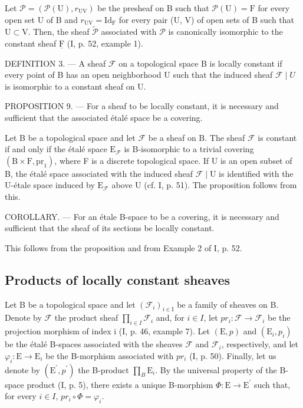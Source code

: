 Let \(\mathcal{P} = (\mathcal{P}(\mathrm{U}), r_{\mathrm{UV}})\) be the presheaf on B such that \(\mathcal{P}(\mathrm{U}) = \mathrm{F}\) for every open set U of B and \(r_{\mathrm{UV}} = \mathrm{Id}_{\mathrm{F}}\) for every pair (U, V) of open sets of B such that \(\mathrm{U} \subset \mathrm{V}\). Then, the sheaf \(\widetilde{\mathcal{P}}\) associated with \(\mathcal{P}\) is canonically isomorphic to the constant sheaf \(\underline{\mathrm{F}}\) (I, p. 52, example 1).

DEFINITION 3. --- A sheaf \(\mathcal{F}\) on a topological space B is locally constant if every point of B has an open neighborhood U such that the induced sheaf \(\mathcal{F} \mid U\) is isomorphic to a constant sheaf on U.

PROPOSITION 9. --- For a sheaf to be locally constant, it is necessary and sufficient that the associated étalé space be a covering.

Let B be a topological space and let \(\mathcal{F}\) be a sheaf on B. The sheaf \(\mathcal{F}\) is constant if and only if the étalé space \(\mathrm{E}_{\mathcal{F}}\) is B-isomorphic to a trivial covering \((\mathrm{B} \times \mathrm{F},\mathrm{pr}_1)\), where F is a discrete topological space. If U is an open subset of B, the étalé space associated with the induced sheaf \(\mathcal{F} \mid \mathrm{U}\) is identified with the U-étale space induced by \(\mathrm{E}_{\mathcal{F}}\) above U (cf. I, p. 51). The proposition follows from this.

COROLLARY. --- For an étale B-space to be a covering, it is necessary and sufficient that the sheaf of its sections be locally constant.

This follows from the proposition and from Example 2 of I, p. 52.

\subsection{Products of locally constant sheaves}

Let B be a topological space and let \((\mathcal{F}_{i})_{i\in\mathrm{I}}\) be a family of sheaves on B. Denote by \(\mathcal{F}\) the product sheaf \(\prod_{i\in I}\mathcal{F}_{i}\) and, for \(i\in I\), let \(pr_{i}\colon \mathcal{F}\to\mathcal{F}_{i}\) be the projection morphism of index i (I, p. 46, example 7). Let \((\mathrm{E},p)\) and \((\mathrm{E}_{i},p_{i})\) be the étalé B-spaces associated with the sheaves \(\mathcal{F}\) and \(\mathcal{F}_{i}\), respectively, and let \(\varphi_{i}\colon \mathrm{E}\to \mathrm{E}_{i}\) be the B-morphism associated with \(pr_{i}\) (I, p. 50). Finally, let us denote by \((\mathrm{E}^{\prime},p^{\prime})\) the B-product \(\prod_{B}\mathrm{E}_{i}\). By the universal property of the B-space product (I, p. 5), there exists a unique B-morphism \(\Phi\colon \mathrm{E}\to \mathrm{E}^{\prime}\) such that, for every \(i\in I\), \(pr_{i}\circ\Phi=\varphi_{i}\).

